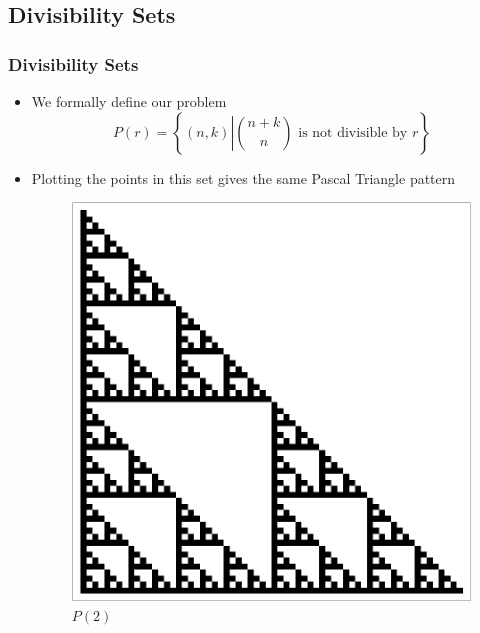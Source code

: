 \documentclass{beamer}
\begin{document}
\subsection{Divisibility Sets}
\begin{frame}
    \frametitle{Divisibility Sets}
    \begin{itemize}
        \item We formally define our problem
        \begin{equation*}
            P(r) = \left\{ (n,k) \left| \binom{n+k}{n} \text{ is not divisible by }r \right. \right\}
        \end{equation*}
        \item Plotting the points in this set gives the same Pascal Triangle pattern
        \begin{figure}
            \centering
            \includegraphics[scale = 0.25]{seir.pdf}
            \caption{$P(2)$}
        \end{figure}
    \end{itemize}
\end{frame}
\end{document}
